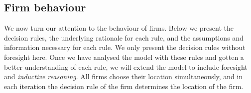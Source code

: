 \documentclass[preprint, 12pt]{elsarticle}
\newcommand*{\TODO}{\textbf{\fbox{??}}}%
\newcommand{\Figtext}[1]{%
	\begin{tablenotes}[para,flushleft]
		\hangindent=1em
		\footnotesize
		\raggedright
		#1
	\end{tablenotes}
}
\newcommand{\Fignote}[1]{\Figtext{\emph{Note:~}~#1}}
\begin{document}

\subsection{Firm behaviour}

We now turn our attention to the behaviour of firms. Below we present the decision rules, the underlying rationale for each rule, and the assumptions and information necessary for each rule. We only present the decision rules without foresight here. Once we have analysed the model with these rules and gotten a better understanding of each rule, we will extend the model to include foresight and \emph{inductive reasoning}. All firms choose their location simultaneously, and in each iteration the decision rule of the firm determines the location of the firm.
\end{document}
